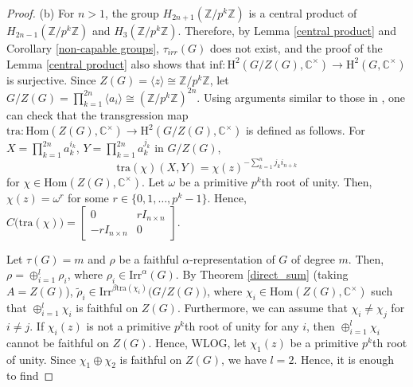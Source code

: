 \documentclass[a4paper,11pt]{amsart}
\numberwithin{equation}{section}
\numberwithin{equation}{subsection}
\newcommand{\C}{\mathbb{C}}
\newcommand{\Z}{\mathbb{Z}}
\newcommand{\irr}{\mathrm{Irr}}
\newcommand{\Hom}{\mathrm{Hom}}
\newcommand{\bchi}{\Bar{\chi}}
\newcommand{\x}{\Bar{x}}
\newcommand{\y}{\Bar{y}}
\newcommand{\poonam}[1]{{\color{blue} #1}}
\begin{document}
\begin{proof}
	
	
	
	(b) For $n > 1$, the group $H_{2n+1}(\Z/p^k\Z)$ is a central product of $H_{2n-1}(\Z/p^k\Z)$ and $H_{3}(\Z/p^k\Z)$. Therefore, by Lemma \ref{central product} and Corollary \ref{non-capable groups}, $\tau_{irr}(G)$ does not exist, and the proof of the Lemma \ref{central product} also shows that $\mathrm{inf}: \mathrm{H}^2(G/Z(G), \C^{\times}) \to \mathrm{H}^2(G, \C^{\times})$ is surjective. Since $Z(G) = \langle z \rangle \cong \Z/p^k\Z$,  let $G/Z(G) = \prod_{k=1}^{2n}\langle a_i \rangle \cong (\Z/p^k\Z)^{2n}$. Using arguments similar to those in \cite[Proof of Theorem 1.7]{sabnam}, one can check that the transgression map $\mathrm{tra} : \mathrm{Hom}(Z(G), \mathbb{C}^{\times}) \to \mathrm{H}^2(G/Z(G), \mathbb{C}^{\times})$ is defined as follows. For $X = \prod_{k=1}^{2n} a_k^{i_k}$, $Y = \prod_{k=1}^{2n} a_k^{j_k} $ in $G/Z(G)$, $$\mathrm{tra}(\chi)(X, Y) = \chi(z)^{-\sum_{k=1}^n j_k i_{n+k}}$$ for $\chi \in \mathrm{Hom}(Z(G), \mathbb{C}^{\times})$. Let $\omega$ be a primitive $p^k$th root of unity. Then, $\chi(z)= \omega^r$ for some $r\in \{0,1,\dots,p^k-1\}$.
	Hence, $C\big(\mathrm{tra}(\chi)\big)= 
	\begin{bmatrix}
		0 & rI_{n \times n} \\
		-rI_{n \times n} & 0
	\end{bmatrix}$.
	
	Let $\tau(G)= m$ and $\rho$ be a faithful $\alpha$-representation of $G$ of degree $m$. Then, $\rho= \oplus_{i=1}^l\rho_i$, where $\rho_i \in \irr^{\alpha}(G)$. By Theorem \ref{direct_sum} (taking $A= Z(G)$), $\tilde\rho_i \in \mathrm{Irr}^{\beta\mathrm{tra}(\chi_i)}\big(G/Z(G)\big)$, where $\chi_i \in  \Hom(Z(G), \mathbb{C}^{\times})$ such that $\oplus_{i=1}^l\chi_i$ is faithful on $Z(G)$. 
	Furthermore, we can assume that $\chi_i \neq \chi_j$ for $i \neq j$. If $\chi_i(z)$ is not a primitive $p^k$th root of unity for any $i$, then $\oplus_{i=1}^l\chi_i$ cannot be faithful on $Z(G)$. Hence, WLOG, let $\chi_1(z)$ be a primitive $p^k$th root of unity. Since $\chi_1 \oplus \chi_2$ is faithful on $Z(G)$, we have $l=2$. 
	Hence, it is enough to find 
	

\end{proof}
\end{document}
